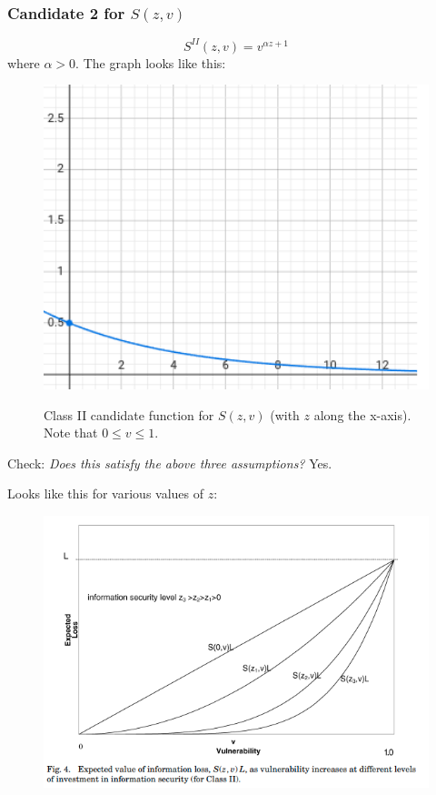 \documentclass[11pt]{article}
\begin{document}
\subsubsection{Candidate 2 for $S(z,v)$}


$$S^{II}(z,v) = v^{\alpha z + 1}$$
where $\alpha > 0$. The graph looks like this:

\begin{figure}[h]
    \centering
    \includegraphics*[width=4.5in]{class2.png}
    \label{fig:class1}
    \caption{Class II candidate function for $S(z,v)$ (with $z$ along the x-axis). Note that $0 \leq v \leq 1$.}
\end{figure}
\FloatBarrier

Check: {\it Does this satisfy the above three assumptions?} Yes.

Looks like this for various values of $z$:
\begin{figure}[h]
    \centering
    \includegraphics*[width=4.5in]{fig4.png}
    \label{fig:fig4}
\end{figure}
\FloatBarrier
\end{document}
